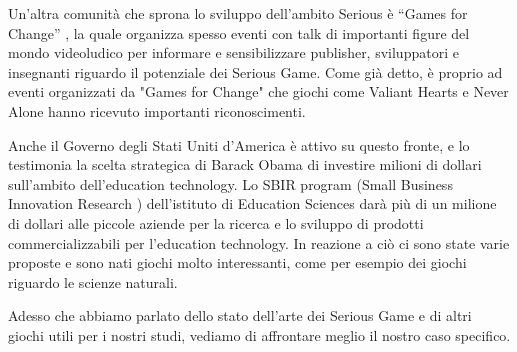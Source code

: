 Un'altra comunità che sprona lo sviluppo dell'ambito Serious è ``Games for Change'' \cite{gamesforchange}, la quale organizza spesso eventi con talk di importanti figure del mondo videoludico per informare e sensibilizzare publisher, sviluppatori e insegnanti riguardo il potenziale dei Serious Game. Come già detto, è proprio ad eventi organizzati da "Games for Change" che giochi come Valiant Hearts e Never Alone hanno ricevuto importanti riconoscimenti.

Anche il Governo degli Stati Uniti d'America è attivo su questo fronte, e lo testimonia la scelta strategica di Barack Obama di investire milioni di dollari sull'ambito dell'education technology. Lo SBIR program (Small Business Innovation Research \cite{sbirprogram}) dell'istituto di Education Sciences darà più di un milione di dollari alle piccole aziende per la ricerca e lo sviluppo di prodotti commercializzabili per l'education technology. In reazione a ciò ci sono state varie proposte e sono nati giochi molto interessanti, come per esempio dei giochi riguardo le scienze naturali.


Adesso che abbiamo parlato dello stato dell'arte dei Serious Game e di altri giochi utili per i nostri studi, vediamo di affrontare meglio il nostro caso specifico.

\newpage
